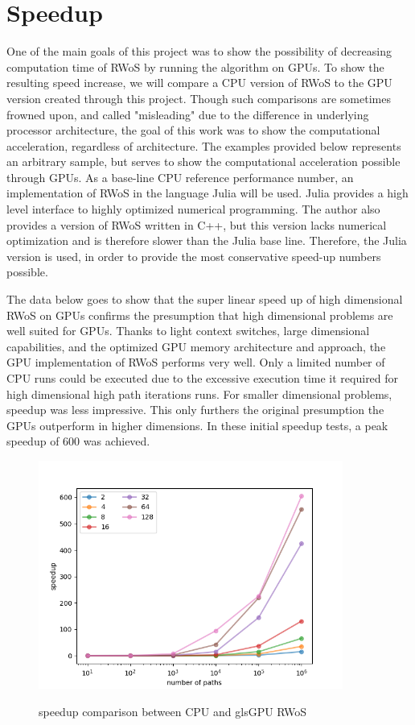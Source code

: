 \section{Speedup}
One of the main goals of this project was to show the possibility of decreasing computation
time of \Gls{RWoS} by running the algorithm on \Glspl{GPU}.  To show the resulting
speed increase, we will compare a CPU version of \Gls{RWoS} to the \Gls{GPU} version
created through this project.  Though such comparisons are sometimes frowned
upon, and called "misleading" due to the difference in underlying processor architecture,
the goal of this work was to show the computational acceleration, regardless of architecture.
The examples provided below represents an arbitrary sample, but serves to show the
computational acceleration possible through \Glspl{GPU}.  As a base-line \Gls{CPU}
reference performance number, an implementation of \Gls{RWoS} in the language
Julia will be used.  Julia provides a high level interface to highly optimized
numerical programming.  The author also provides a version of \Gls{RWoS} written
in C++, but this version lacks numerical optimization and is therefore slower than
the Julia base line.  Therefore, the Julia version is used, in order to provide
the most conservative \Gls{speed-up} numbers possible.
\par
The data below goes to show that the super linear speed up of high dimensional
\Gls{RWoS} on \Glspl{GPU} confirms the presumption that high dimensional problems
are well suited for \Glspl{GPU}.  Thanks to light context switches, large dimensional capabilities,
and the optimized \Gls{GPU} memory architecture and approach, the \Gls{GPU} implementation
of \Gls{RWoS} performs very well.  Only a limited number of \gls{CPU} runs could
be executed due to the excessive execution time it required for high dimensional
high path iterations runs. For smaller dimensional problems, speedup was less impressive.
 This only furthers the original presumption the \glspl{GPU} outperform in higher dimensions.
In these initial speedup tests, a peak speedup of 600 was achieved.
\begin{figure}[hbt!]
\begin{center}
\includegraphics[width=10.0cm]{styles/speedup} \label{plot:speedup}
  \caption{speedup comparison between \gls{CPU} and gls{GPU} \Gls{RWoS}}
\end{center}
\end{figure}
